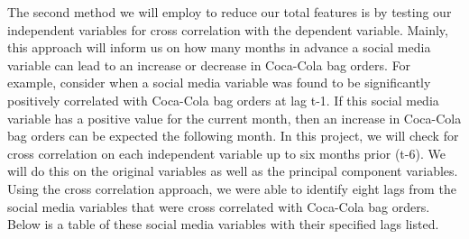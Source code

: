 \documentclass[12pt,oneside]{chicagocapstone}
\begin{document}
The second method we will employ to reduce our total features is by testing our independent variables for cross correlation with the dependent variable. Mainly, this approach will inform us on how many months in advance a social media variable can lead to an increase or decrease in Coca-Cola bag orders. For example, consider when a social media variable was found to be significantly positively correlated with Coca-Cola bag orders at lag t-1. If this social media variable has a positive value for the current month, then an increase in Coca-Cola bag orders can be expected the following month. In this project, we will check for cross correlation on each independent variable up to six months prior (t-6). We will do this on the original variables as well as the principal component variables. Using the cross correlation approach, we were able to identify eight lags from the social media variables that were cross correlated with Coca-Cola bag orders. Below is a table of these social media variables with their specified lags listed.
\end{document}
